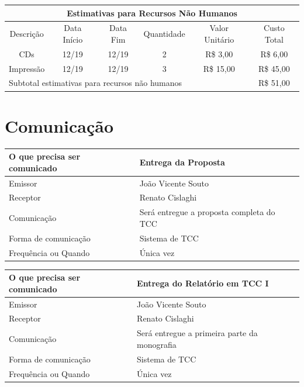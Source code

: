 \documentclass[
	12pt,				%
	openright,			%
	twoside,			%
	a4paper,			%
	english,			%
	brazil,				%
	]{abntex2}
\begin{document}
\begin{center}
\begin{tabular}{|c|c|c|c|c|c|}
\hline
\multicolumn{6}{|c|}{Estimativas para Recursos Não Humanos} \\ \hline
    Descrição & Data Início & Data Fim & Quantidade & Valor Unitário & Custo Total \\
    \hline
    CDs       & 12/19 & 12/19 & 2 & R\$ 3,00  & R\$ 6,00 \\ \hline
    Impressão & 12/19 & 12/19 & 3 & R\$ 15,00 & R\$ 45,00 \\ \hline
\multicolumn{5}{|l|}{Subtotal estimativas para recursos não humanos} & R\$ 51,00 \\
\hline
\end{tabular}
\end{center}

\section{Comunicação}

\begin{center}
\begin{tabular}{|l|p{9cm}|}
\hline
    O que precisa ser comunicado & Entrega da Proposta \\ \hline
    Emissor & João Vicente Souto \\ \hline
    Receptor & Renato Cislaghi \\ \hline
    Comunicação & Será entregue a proposta completa do TCC \\ \hline
    Forma de comunicação & Sistema de TCC \\ \hline
    Frequência ou Quando & Única vez \\ \hline
\end{tabular}
\end{center}

\begin{center}
\begin{tabular}{|l|p{9cm}|}
\hline
    O que precisa ser comunicado & Entrega do Relatório em TCC I \\ \hline
    Emissor & João Vicente Souto \\ \hline
    Receptor & Renato Cislaghi \\ \hline
    Comunicação & Será entregue a primeira parte da monografia \\ \hline
    Forma de comunicação & Sistema de TCC \\ \hline
    Frequência ou Quando & Única vez \\ \hline
\end{tabular}
\end{center}
\end{document}
